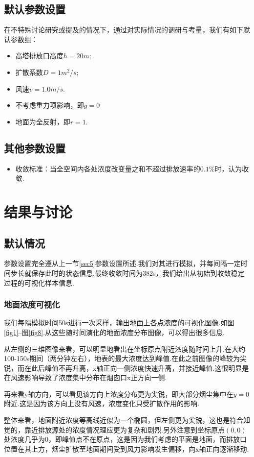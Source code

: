 \documentclass{article}
\begin{document}
	\subsection{默认参数设置}
	在不特殊讨论研究或提及的情况下，通过对实际情况的调研与考量，我们有如下默认参数组：
	\begin{itemize}
		\item 高塔排放口高度$h=20m$;
		\item 扩散系数$D=1m^2/s$;
		\item 风速$v=1.0m/s$.
		\item 不考虑重力项影响，即$g=0$
		\item 地面为全反射，即$r=1$.
	\end{itemize}

	\subsection{其他参数设置}
	\begin{itemize}
		\item 收敛标准：当全空间内各处浓度改变量之和不超过排放速率的$0.1\%$时，认为收敛.
	\end{itemize}
	
	\section{结果与讨论}\label{sec6}
	\subsection{默认情况}
	参数设置完全遵从上一节\cref{sec5}参数设置所述.我们对其进行模拟，并每间隔一定时间步长就保存此时的状态信息.最终收敛时间为382s，我们给出从初始到收敛稳定过程的可视化样本信息.
	\subsubsection{地面浓度可视化}
	我们每隔模拟时间50s进行一次采样，输出地面上各点浓度的可视化图像.如图\ref{fig1}--图\ref{fig8}.从这些随时间演化的地面浓度分布图像，可以得出很多信息.
	\par 从左侧的三维图像来看，可以明显地看出在坐标原点附近浓度随时间上升.在大约100-150s期间（两分钟左右），地表的最大浓度达到峰值.在此之前图像的峰较为尖锐，而在此后峰值不再升高，x轴正向一侧浓度快速升高，并接近峰值.这很明显是在风速影响导致了浓度集中分布在烟囱口x正方向一侧.
	\par 再来看y轴方向，可以看见该方向上浓度分布更为尖锐，即大部分烟尘集中在$y=0$附近.这是因为该方向上没有风速，浓度变化只受扩散作用的影响.
	\par 整体来看，地面附近浓度等高线近似为一个椭圆，但左侧更为尖锐，这也是符合知觉的，靠近排放源处的浓度情况理应更为复杂和剧烈.另外注意到坐标原点$(0,0)$处浓度几乎为0，即峰值点不在原点，这是因为我们考虑的平面是地面，而排放口位置在其上方，烟尘扩散至地面期间受到风力影响发生偏移，向x轴正向逐渐移动.
	
\end{document}
